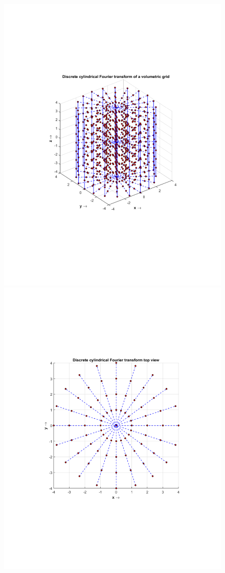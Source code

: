 \documentclass{UCF_ETD}
\begin{document}
\begin{figure}[H]   
\begin{center}
\includegraphics[scale=0.32]{FVR/DCFTVolumeFull}
\includegraphics[scale=0.3]{FVR/DCFTVolumeTopView}

\end{center}
\end{figure}
\end{document}
